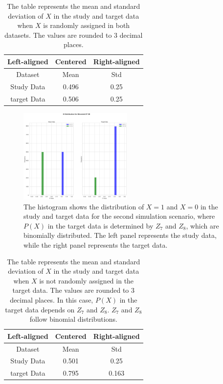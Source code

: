 \documentclass[12pt,oneside]{amsart}
\theoremstyle{definition}
\theoremstyle{remark}
\numberwithin{equation}{section}
\begin{document}
\begin{table}[!h]
\centering
    \tiny
    \begin{tabular}{|c|c|c|}
        \toprule
    Left-aligned & Centered & Right-aligned \\ 
        \midrule
    Dataset & Mean & Std \\ 
    Study Data & 0.496 & 0.25 \\ 
    target Data & 0.506 & 0.25 \\ 
    \bottomrule
    \end{tabular}
    \caption{The table represents the mean and standard deviation of $X$ in the study and target data when $X$ is randomly assigned in both datasets. The values are rounded to $3$ decimal places.}
    \label{tab:x_random}

\end{table}



\begin{figure}[!h]
    \centering
    \includegraphics[width=0.5\textwidth]{Report/Figure/xnorandom1.jpg}
    \caption{The histogram shows the distribution of $X=1$ and $X=0$ in the study and target data for the second simulation scenario, where $P(X)$ in the target data is determined by $Z_7$ and $Z_8$, which are binomially distributed. The left panel represents the study data, while the right panel represents the target data.}
    \label{fig:xnorandom1}
\end{figure}

\begin{table}[!h]
\centering
\tiny
\begin{tabular}{|c|c|c|}
    \toprule
    Left-aligned & Centered & Right-aligned \\ 
    \midrule
    Dataset & Mean & Std \\ 
    Study Data & 0.501& 0.25 \\ 
    target Data & 0.795 & 0.163 \\ 
    \bottomrule
\end{tabular}
\caption{The table represents the mean and standard deviation of $X$ in the study and target data when $X$ is not randomly assigned in the target data. The values are rounded to $3$ decimal places. In this case, $P(X)$ in the target data depends on $Z_7$ and $Z_8$. $Z_7$ and $Z_8$ follow binomial distributions.}
\label{tab:x_z7z8_bi}
\end{table}
\end{document}

